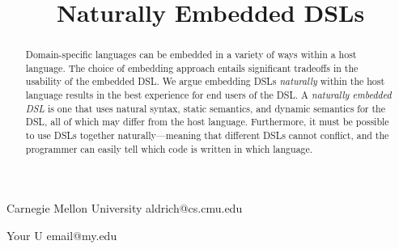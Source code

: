 \documentclass[preprint]{sigplanconf}
\begin{document}
\setlength{\pdfpageheight}{\paperheight}
\setlength{\pdfpagewidth}{\paperwidth}




\title{Naturally Embedded DSLs}

           {Carnegie Mellon University}
           {aldrich@cs.cmu.edu}

           {Your U}
           {email@my.edu}
		   
		   
		   
		   
\maketitle

\begin{abstract}
Domain-specific languages can be embedded in a variety of ways within a
host language.  The choice of embedding approach entails significant
tradeoffs in the usability of the embedded DSL.  We argue embedding DSLs
\textit{naturally} within the host language results in the best
experience for end users of the DSL.  A \textit{naturally embedded DSL}
is one that uses natural syntax, static semantics, and dynamic semantics
for the DSL, all of which may differ from the host language.
Furthermore, it must be possible to use DSLs together
naturally---meaning that different DSLs cannot conflict, and the
programmer can easily tell which code is written in which language.
\end{abstract}
\end{document}
